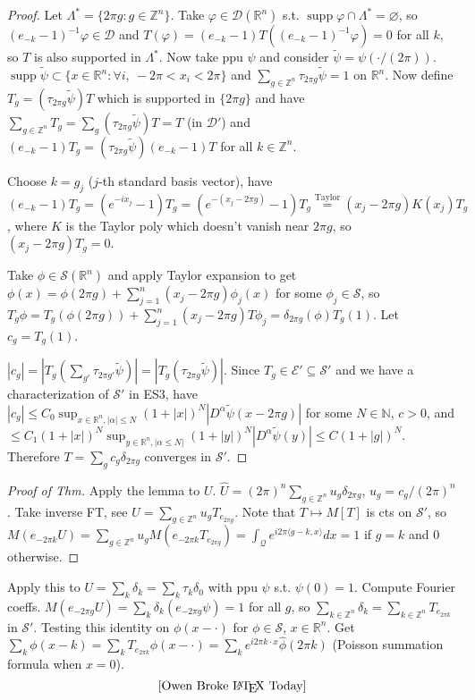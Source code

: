 \documentclass{article}
\theoremstyle{definition}
\theoremstyle{remark}
\theoremstyle{plain}
\newcommand{\NN}{\mathbb{N}}
\newcommand{\ZZ}{\mathbb{Z}}
\newcommand{\RR}{\mathbb{R}}
\newcommand{\calD}{\mathcal{D}}
\begin{document}
\begin{proof}
    Let $\Lambda^\ast=\{2\pi g:g\in\ZZ^n\}$. Take $\varphi\in\mathcal D(\RR^n)$ s.t. $\operatorname{supp}\varphi\cap\Lambda^\ast=\varnothing$, so $(e_{-k}-1)^{-1}\varphi\in \calD$ and $T(\varphi)=(e_{-k}-1)T((e_{-k}-1)^{-1}\varphi)=0$ for all $k$, so $T$ is also supported in $\Lambda^\ast$. Now take ppu $\psi$ and consider $\tilde\psi=\psi(\cdot/(2\pi))$. $\operatorname{supp}\tilde\psi\subset\{x\in\RR^n:\forall i,\ -2\pi<x_i<2\pi \}$ and $\sum_{g\in\ZZ^n}\tau_{2\pi g}\tilde\psi =1$ on $\RR^n$. Now define $T_g=(\tau_{2\pi g}\tilde\psi )T$ which is supported in $\{2\pi g\}$ and have $\sum_{g\in\ZZ^n}T_g=\sum_g(\tau_{2\pi g}\tilde\psi) T=T$ (in $\calD'$) and $(e_{-k}-1)T_g=(\tau_{2\pi g}\tilde\psi)(e_{-k}-1)T$ for all $k\in\ZZ^n$.

    Choose $k=g_j$ ($j$-th standard basis vector), have $(e_{-k}-1)T_g=(e^{-ix_j}-1)T_g=(e^{-(x_j-2\pi g)}-1)T_g\overset{\text{Taylor}}{=}(x_j-2\pi g)K(x_j)T_g$, where $K$ is the Taylor poly which doesn't vanish near $2\pi g$, so $(x_j-2\pi  g)T_g=0$.

    Take $\phi\in\mathcal S(\RR^n)$ and apply Taylor expansion to get $\phi(x)=\phi(2\pi g)+\sum_{j=1}^n(x_j-2\pi g)\phi_j(x)$ for some $\phi_j\in\mathcal S$, so $T_g\phi=T_g(\phi(2\pi g))+\sum_{j=1}^n(x_j-2\pi g)T\phi_j=\delta_{2\pi g}(\phi)T_g(1)$. Let $c_g=T_g(1)$.

    $|c_g|=|T_g(\sum_{g'}\tau_{2\pi g'}\tilde\psi)|=|T_g(\tau_{2\pi g}\tilde\psi)|$. Since $T_g\in\mathcal E'\subseteq\mathcal S'$ and we have a characterization of $\mathcal S'$ in ES3, have
    $|c_g|\le C_0\sup_{x\in\RR^n,|\alpha|\le N}(1+|x|)^N|D^\alpha\tilde\psi(x-2\pi g)|$ for some $N\in\NN$, $c>0$, and $\le C_1(1+|x|)^N\sup_{y\in\RR^n,|\alpha\le N|}(1+|y|)^N|D^\alpha\tilde\psi(y)|\le C(1+|g|)^N$. Therefore $T=\sum_{g}c_g\delta_{2\pi g}$ converges in $\mathcal S'$.
\end{proof}
\begin{proof}[Proof of Thm]
    Apply the lemma to $U$. $\hat U=(2\pi)^n\sum_{g\in\ZZ^n}u_g\delta_{2\pi g}$, $u_g=c_g/(2\pi)^n$. Take inverse FT, see $U=\sum_{g\in\ZZ^n}u_g T_{e_{2\pi g}}$. Note that $T\mapsto M[T]$ is cts on $\mathcal S'$, so $M(e_{-2\pi k}U)=\sum_{g\in\ZZ^n}u_gM(e_{-2\pi k}T_{e_{2\pi g}})=\int_{\mathcal Q}e^{i2\pi\langle g-k,x\rangle}dx=1$ if $g=k$  and $0$ otherwise.
\end{proof}
Apply this to $U=\sum_k\delta_k=\sum_{k}\tau_k\delta_0$ with ppu $\psi$ s.t. $\psi(0)=1$. Compute Fourier coeffs.
$M(e_{-2\pi g}U)=\sum_k\delta_k(e_{-2\pi g} \psi)=1$ for all $g$, so $\sum_{k\in\ZZ^n}\delta_k=\sum_{k\in\ZZ^n}T_{e_{2\pi k}}$ in $\mathcal S'$.
Testing this identity on $\phi(x-\cdot)$ for $\phi\in\mathcal S$, $x\in\RR^n$. Get $\sum_k\phi(x-k)=\sum_{k}T_{e_{2\pi k}}\phi(x-\cdot)=\sum_{k}e^{i2\pi k\cdot x}\hat\phi(2\pi k)$ (Poisson summation formula when $x=0$).
\[\text{[Owen Broke \LaTeX{} Today]}\]
\end{document}
